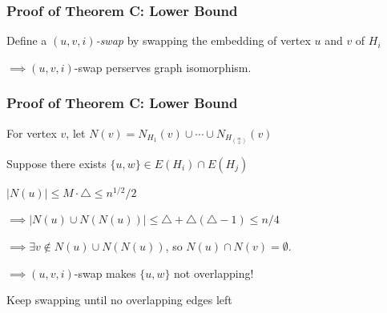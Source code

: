 \documentclass{beamer}
\begin{document}
\begin{frame}
  \frametitle{Proof of Theorem C: Lower Bound}

  Define a \textit{$(u, v, i)$-swap} by swapping the embedding of vertex $u$ and $v$ of $H_i$

  \pause

  \vspace{0.7cm} 
  
  $\implies (u, v, i)$-swap perserves graph isomorphism.
\end{frame}

\begin{frame}
  \frametitle{Proof of Theorem C: Lower Bound}

  For vertex $v$, let $N(v) = N_{H_1}(v) \cup \cdots \cup N_{H_{\binom{m}{2}}}(v)$

  \pause

  \vspace{0.5cm} 

  Suppose there exists $\{u, w\} \in E(H_i) \cap E(H_j)$

  \pause

  \vspace{0.5cm} 

  $|N(u)| \leq M \cdot \triangle \leq n^{1/2}/2$

  \pause

  \vspace{0.5cm} 

  $\implies |N(u) \cup N(N(u))| \leq \triangle + \triangle(\triangle - 1) \leq n/4$

  \pause

  \vspace{0.5cm} 

  $\implies \exists v \notin N(u) \cup N(N(u))$, so $N(u) \cap N(v) = \emptyset$.

  \pause

  \vspace{0.5cm} 

  $\implies (u, v, i)$-swap makes $\{u, w\}$ not overlapping!

  \pause

  \vspace{0.5cm} 

  Keep swapping until no overlapping edges left

\end{frame}
\end{document}
